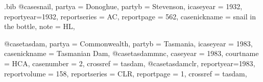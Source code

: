 \begin{filecontents*}[overwrite]{\jobname.bib}
@case{snail,
  partya = {Donoghue}, 
  partyb = {Stevenson},
  icaseyear = {1932},
  reportyear={1932},
  reportseries = {AC},
  reportpage = {562},
  casenickname = {snail in the bottle},
  note = {HL},
	}


@case{tasdam,
  partya = {Commonwealth}, 
  partyb = {Tasmania},
  icaseyear = {1983},
  casenickname = {Tasmanian Dam},
  }
@case{tasdammnc,
  caseyear = {1983},
  courtname = {HCA},
  casenumber = {2},
  crossref = {tasdam},
  }
@case{tasdamclr,
  reportyear={1983},
  reportvolume = {158},
  reportseries = {CLR},
  reportpage = {1},
  crossref = {tasdam},
  	}


\end{filecontents*}
